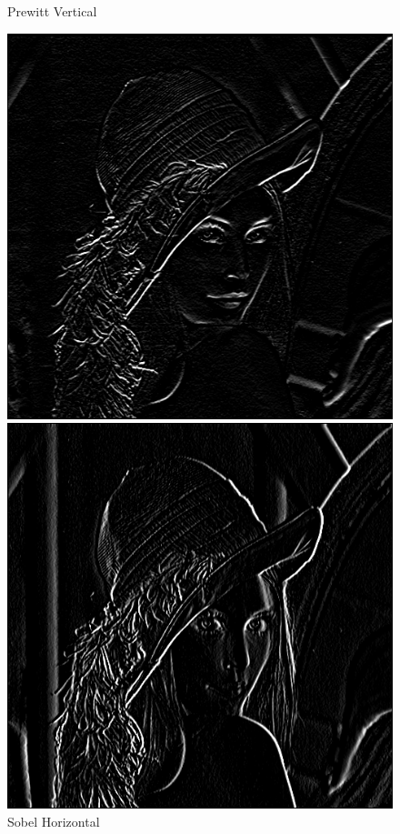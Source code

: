 \documentclass[11pt]{article}
\begin{document}
\begin{figure}[H]
\begin{minipage}[c]{.46\linewidth}
			\caption{Prewitt Vertical}
			\label{fig:PrewittVertical}
		\end{minipage}
		\vskip 0.5cm
		\begin{minipage}[c]{.46\linewidth}
			\centering
			\includegraphics[scale=0.25]{Image/filtreSobelHorizontal.png}
			\caption{Sobel Horizontal}
			\label{fig:SobelHorizontal}
		\end{minipage} \hfill
		\begin{minipage}[c]{.46\linewidth}
		\centering
			\includegraphics[scale=0.25]{Image/filtreSobelVertical.png}

\end{minipage}
\end{figure}
\end{document}
